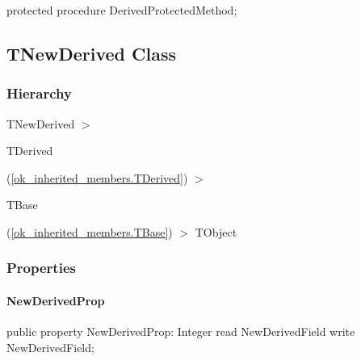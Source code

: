 \documentclass{report}
\begin{document}
\begin{list}{}{
\setlength{\itemindent}{0cm}
\setlength{\listparindent}{0cm}
\setlength{\leftmargin}{\evensidemargin}
\addtolength{\leftmargin}{\tmplength}
\settowidth{\labelsep}{X}
\addtolength{\leftmargin}{\labelsep}
\setlength{\labelwidth}{\tmplength}
}
\begin{flushleft}
\item[\textbf{Declaration}\hfill]
\begin{ttfamily}
protected procedure DerivedProtectedMethod;\end{ttfamily}


\end{flushleft}
\end{list}
\subsection*{TNewDerived Class}
\subsubsection*{\large{\textbf{Hierarchy}}\normalsize\hspace{1ex}\hfill}
TNewDerived {$>$} \begin{ttfamily}TDerived\end{ttfamily}(\ref{ok_inherited_members.TDerived}) {$>$} \begin{ttfamily}TBase\end{ttfamily}(\ref{ok_inherited_members.TBase}) {$>$} 
TObject
\subsubsection*{\large{\textbf{Properties}}\normalsize\hspace{1ex}\hfill}
\paragraph*{NewDerivedProp}\hspace*{\fill}

\begin{list}{}{
\setlength{\itemindent}{0cm}
\setlength{\listparindent}{0cm}
\setlength{\leftmargin}{\evensidemargin}
\addtolength{\leftmargin}{\tmplength}
\settowidth{\labelsep}{X}
\addtolength{\leftmargin}{\labelsep}
\setlength{\labelwidth}{\tmplength}
}
\begin{flushleft}
\item[\textbf{Declaration}\hfill]
\begin{ttfamily}
public property NewDerivedProp: Integer read NewDerivedField write NewDerivedField;\end{ttfamily}


\end{flushleft}
\end{list}
\end{document}
